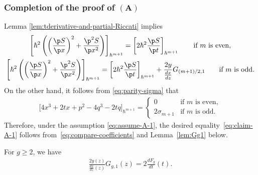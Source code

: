 \subsubsection[Completion of the proof of $(A)$]{Completion of the proof of $\boldsymbol{(A)}$}
\label{subsec:proof-A-2}

Lemma \ref{lem:tderivative-and-partial-Riccati} implies
\begin{gather}
\left[ \hbar^{2}\left( \left(\frac{\p S}{\p x}\right)^{2}
+ \frac{\p^{2} S}{\p x^{2}} \right)  \right]_{\hbar^{m+1}}
= \left[ 2\hbar^{2} \frac{\p S}{\p t} \right]_{\hbar^{m+1}}
 \qquad \text{if $m$ is even},\nonumber\\
\left[ \hbar^{2}\left( \left(\frac{\p S}{\p x}\right)^{2}
+ \frac{\p^{2} S}{\p x^{2}} \right)  \right]_{\hbar^{m+1}}
= \left[ 2\hbar^{2} \frac{\p S}{\p t} \right]_{\hbar^{m+1}}
+ \frac{2y}{\frac{dx}{dz}} G_{(m+1)/2,1}
\qquad \text{if $m$ is odd.}
\label{eq:compare-coefficients}
\end{gather}
On the other hand, it follows from \eqref{eq:parity-sigma} that
\begin{gather*}
\bigl[4x^{3}+2tx + p^{2} -4q^{3} -2 tq \bigr]_{\hbar^{m+1}}
=
\begin{cases}
0 & \text{if $m$ is even}, \\
2\sigma_{m+1} & \text{if $m$ is odd}.
\end{cases}
\end{gather*}
Therefore, under the assumption \eqref{eq:assume-A-1},
the desired equality~\eqref{eq:claim-A-1}
follows from~\eqref{eq:compare-coefficients}
and Lem\-ma~\ref{lem:Gg1} below.

\begin{lem} \label{lem:Gg1}
For $g \ge 2$, we have
\begin{gather} \label{eq:n-is-1-part-in-Ggn}
\frac{2y(z)}{\frac{dx}{dz}(z)} G_{g,1}(z) =
 2 \frac{dF_{g}}{dt}(t).
\end{gather}
\end{lem}

